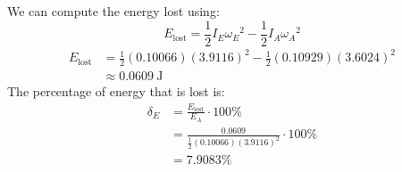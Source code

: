 \documentclass[article, 11pt]{article}
\begin{document}
    We can compute the energy lost using:
    \begin{equation*}
        E_\text{lost} = \frac{1}{2}I_E{\omega_E}^2 - \frac{1}{2}I_A{\omega_A}^2
    \end{equation*}
    \begin{align*}
        E_\text{lost} &= \frac{1}{2}(0.10066)(3.9116)^2 - \frac{1}{2}(0.10929)(3.6024)^2 \\
        &\approx \SI{0.0609}{\joule}
    \end{align*}
    The percentage of energy that is lost is:
    \begin{align*}
        \delta_E &= \frac{E_\text{lost}}{E_A} \cdot 100\% \\
                 &= \frac{0.0609}{\frac{1}{2}(0.10066)(3.9116)^2} \cdot 100\% \\
                 &= 7.9083\%
    \end{align*}
\end{document}
